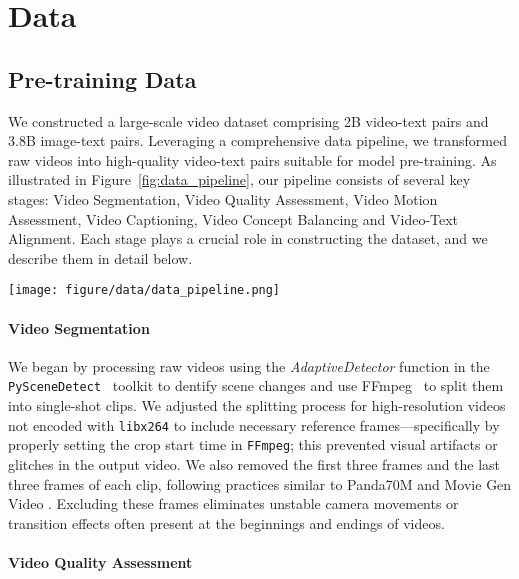 \section{Data}

\subsection{Pre-training Data}
We constructed a large-scale video dataset comprising 2B video-text pairs and 3.8B image-text pairs. Leveraging a comprehensive data pipeline, we transformed raw videos into high-quality video-text pairs suitable for model pre-training. As illustrated in Figure~\ref{fig:data_pipeline}, our pipeline consists of several key stages: Video Segmentation, Video Quality Assessment, Video Motion Assessment, Video Captioning, Video Concept Balancing and Video-Text Alignment. Each stage plays a crucial role in constructing the dataset, and we describe them in detail below.

\begin{figure*}[t]
    \centering
    \texttt{[image: figure/data/data\_pipeline.png]}
    \caption{The pipeline of Step-Video-T2V data process.}
    \label{fig:data_pipeline}
\end{figure*}


\paragraph{Video Segmentation} 
We began by processing raw videos using the \textit{AdaptiveDetector} function in the \texttt{PySceneDetect}~\citep{pyscenedetect} toolkit to dentify scene changes and use FFmpeg~\citep{ffmpeg} to split them into single-shot clips. 
We adjusted the splitting process for high-resolution videos not encoded with \texttt{libx264} to include necessary reference frames—specifically by properly setting the crop start time in \texttt{FFmpeg}; this prevented visual artifacts or glitches in the output video.
We also removed the first three frames and the last three frames of each clip, following practices similar to Panda70M \cite{chen2024panda} and Movie Gen Video \cite{polyak2024moviegencastmedia}. Excluding these frames eliminates unstable camera movements or transition effects often present at the beginnings and endings of videos.


\paragraph{Video Quality Assessment}

